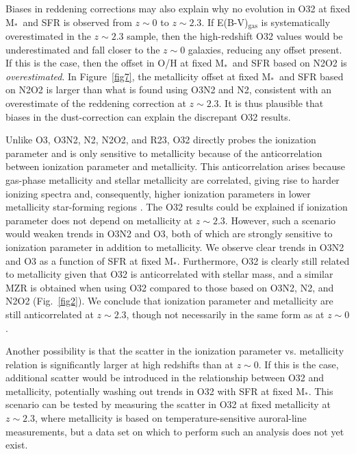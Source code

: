 \documentclass[iop,twocolappendix]{emulateapj}
\newcommand{\mstar}{$\mbox{M}_*$}
\begin{document}
Biases in reddening corrections may also explain why no evolution in O32 at fixed \mstar\ and SFR
 is observed from $z\sim0$ to $z\sim2.3$.  If E(B-V)$_{\text{gas}}$ is systematically overestimated in the
 $z\sim2.3$ sample, then the high-redshift O32 values would be underestimated and fall closer
 to the $z\sim0$ galaxies, reducing any offset present.  If this is the case, then the offset
 in O/H at fixed \mstar\ and SFR based on N2O2 is \textit{overestimated}.
  In Figure~\ref{fig7}, the metallicity offset at fixed \mstar\ and SFR based on N2O2
 is larger than what is found using O3N2 and N2, consistent with an overestimate of the
 reddening correction at $z\sim2.3$.  It is thus plausible that biases in the dust-correction
 can explain the discrepant O32 results.

Unlike O3, O3N2, N2, N2O2, and R23, O32 directly probes the ionization parameter and is only
 sensitive to metallicity because of the anticorrelation between ionization parameter and metallicity.
  This anticorrelation arises because gas-phase
 metallicity and stellar metallicity are correlated, giving rise to harder ionizing spectra
 and, consequently, higher ionization parameters in lower metallicity star-forming regions
 \citep{dop06a,dop06b}.
  The O32 results could be explained if ionization parameter does not depend on metallicity
 at $z\sim2.3$.  However, such a scenario would weaken trends in O3N2 and O3, both of which are
 strongly sensitive to ionization parameter in addition to metallicity.  We observe
 clear trends in O3N2 and O3 as a function of SFR at fixed \mstar.
  Furthermore, O32 is clearly still related to metallicity given that O32
 is anticorrelated with stellar mass, and a similar MZR is obtained when using O32
 compared to those based on O3N2, N2, and N2O2 (Fig.~\ref{fig2}).
  We conclude that ionization parameter and metallicity are still anticorrelated at $z\sim2.3$,
 though not necessarily in the same form as at $z\sim0$.

Another possibility is that the scatter in the ionization parameter vs. metallicity relation
 is significantly larger at high redshifts than at $z\sim0$.  If this is the case, additional
 scatter would be introduced in the relationship between O32 and metallicity, potentially
 washing out trends in O32 with SFR at fixed \mstar.  This scenario can be tested by
 measuring the scatter in O32 at fixed metallicity at $z\sim2.3$, where metallicity is based on
 temperature-sensitive auroral-line measurements, but a data set on which to perform such
 an analysis does not yet exist.
\end{document}
